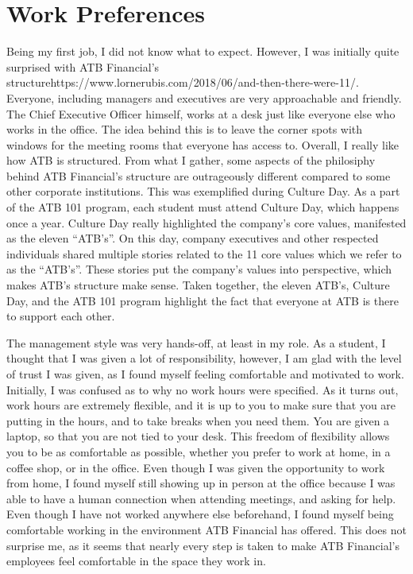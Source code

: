 \documentclass[letterpaper,12pt]{article}
\begin{document}

\section{Work Preferences}

Being my first job, I did not know what to expect.
However, I was initially quite surprised with ATB Financial's structurehttps://www.lornerubis.com/2018/06/and-then-there-were-11/. Everyone, including managers
and executives are very approachable and friendly. The Chief Executive Officer himself, works at
a desk just like everyone else who works in the office. The idea behind this is to leave the
corner spots with windows for the meeting rooms that everyone has access to. 
Overall, I really like how ATB is structured. From what I gather, some aspects of the philosiphy
behind ATB Financial's structure are outrageously different compared to some other corporate institutions.
This was exemplified during Culture Day.
As a part of the ATB 101 program, each student
must attend Culture Day, which happens once a year. Culture Day really highlighted the company's
core values, manifested as the eleven ``ATB's''\cite{11atb}. On this day, company executives and
other respected individuals shared multiple stories related to the 11 core values which we refer to
as the ``ATB's''. These stories put the company's values into perspective, which makes ATB's structure
make sense. Taken together, the eleven ATB's, Culture Day, and the ATB 101 program
highlight the fact that everyone at ATB is there to support each other.


The management style was very hands-off, at least in my role. As a student,
I thought that I was given a lot of responsibility, however, I am glad
with the level of trust I was given, as I found myself feeling
comfortable and motivated to work.
Initially, I was confused as to why no work hours were specified. As it turns out,
work hours are extremely flexible, and it is up to you to make sure that you are
putting in the hours, and to take breaks when you need them. You are given a laptop, so
that you are not tied to your desk. This freedom of flexibility allows you to be
as comfortable as possible, whether you prefer to work at home, in a coffee shop,
or in the office. Even though I was given the opportunity to work from home,
I found myself still showing up in person at the office
because I was able to have a human connection when attending meetings,
and asking for help. Even though I have not worked
anywhere else beforehand, I found myself being comfortable working in the
environment ATB Financial has offered. This does not surprise me, as it seems
that nearly every step is taken to make ATB Financial's employees feel
comfortable in the space they work in. 
\end{document}
